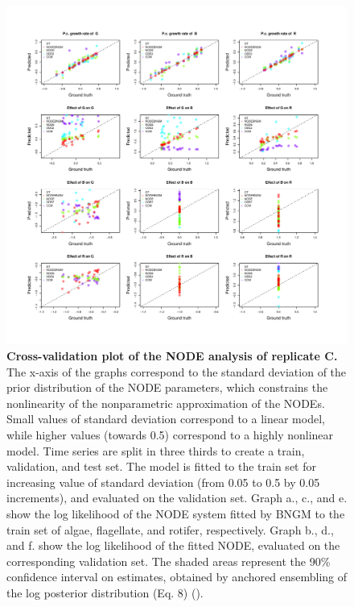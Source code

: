 \documentclass[11pt, oneside]{article}
\begin{document}
\newpage
\begin{figure}[H]
\includegraphics[width=1\linewidth,page=13]{figures/figures_supplementary.pdf}
\caption{
    \textbf{Cross-validation plot of the NODE analysis of replicate C.}
    The x-axis of the graphs correspond to the standard deviation of the prior distribution of the NODE parameters, which constrains the nonlinearity of the nonparametric approximation of the NODEs.
    Small values of standard deviation correspond to a linear model, while higher values (towards 0.5) correspond to a highly nonlinear model.
    Time series are split in three thirds to create a train, validation, and test set. 
    The model is fitted to the train set for increasing value of standard deviation (from 0.05 to 0.5 by 0.05 increments), and evaluated on the validation set.
    Graph a., c., and e. show the log likelihood of the NODE system fitted by BNGM to the train set of algae, flagellate, and rotifer, respectively.
    Graph b., d., and f. show the log likelihood of the fitted NODE, evaluated on the corresponding validation set.
    The shaded areas represent the 90\% confidence interval on estimates, obtained by anchored ensembling of the log posterior distribution (Eq. 8) (\cite{Pearce2018}).
}
\end{figure}
\newpage
\end{document}
